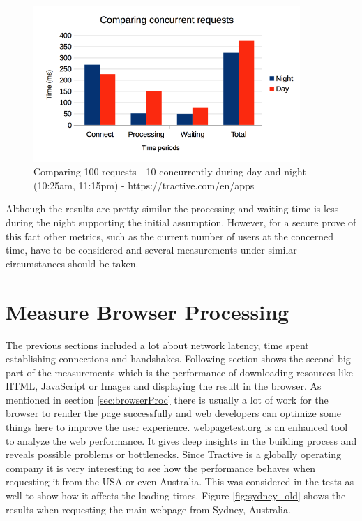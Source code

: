 \begin{figure}[h]
	\centering
		\includegraphics[width=0.9\textwidth]{imgs/day_night_con.png}
	\caption{Comparing 100 requests - 10 concurrently during day and night (10:25am, 11:15pm) - https://tractive.com/en/apps}
\end{figure}

Although the results are pretty similar the processing and waiting time is less during the night supporting the initial assumption. However, for a secure prove of this fact other metrics, such as the current number of users at the concerned time, have to be considered and several measurements under similar circumstances should be taken.

\section{Measure Browser Processing}
\label{sec:browserProcessing}

The previous sections included a lot about network latency, time spent establishing connections and handshakes. Following section shows the second big part of the measurements which is the performance of downloading resources like HTML, JavaScript or Images and displaying the result in the browser. As mentioned in section \ref{sec:browserProc} there is usually a lot of work for the browser to render the page successfully and web developers can optimize some things here to improve the user experience. webpagetest.org is an enhanced tool to analyze the web performance. It gives deep insights in the building process and reveals possible problems or bottlenecks. Since Tractive is a globally operating company it is very interesting to see how the performance behaves when requesting it from the USA or even Australia. This was considered in the tests as well to show how it affects the loading times. Figure \ref{fig:sydney_old} shows the results when requesting the main webpage from Sydney, Australia.

